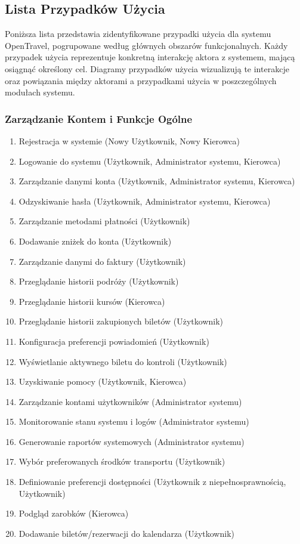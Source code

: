\documentclass[a4paper,12pt]{article}
\begin{document}
\subsection{Lista Przypadków Użycia}
Poniższa lista przedstawia zidentyfikowane przypadki użycia dla systemu OpenTravel, pogrupowane według głównych obszarów funkcjonalnych. Każdy przypadek użycia reprezentuje konkretną interakcję aktora z systemem, mającą osiągnąć określony cel. Diagramy przypadków użycia wizualizują te interakcje oraz powiązania między aktorami a przypadkami użycia w poszczególnych modułach systemu.

\subsubsection{Zarządzanie Kontem i Funkcje Ogólne}
\begin{enumerate}[label=\arabic*.]
    \item Rejestracja w systemie (Nowy Użytkownik, Nowy Kierowca)
    \item Logowanie do systemu (Użytkownik, Administrator systemu, Kierowca)
    \item Zarządzanie danymi konta (Użytkownik, Administrator systemu, Kierowca)
    \item Odzyskiwanie hasła (Użytkownik, Administrator systemu, Kierowca)
    \item Zarządzanie metodami płatności (Użytkownik)
    \item Dodawanie zniżek do konta (Użytkownik)
    \item Zarządzanie danymi do faktury (Użytkownik)
    \item Przeglądanie historii podróży (Użytkownik)
    \item Przeglądanie historii kursów (Kierowca)
    \item Przeglądanie historii zakupionych biletów (Użytkownik)
    \item Konfiguracja preferencji powiadomień (Użytkownik)
    \item Wyświetlanie aktywnego biletu do kontroli (Użytkownik)
    \item Uzyskiwanie pomocy (Użytkownik, Kierowca)
    \item Zarządzanie kontami użytkowników (Administrator systemu)
    \item Monitorowanie stanu systemu i logów (Administrator systemu)
    \item Generowanie raportów systemowych (Administrator systemu)
    \item Wybór preferowanych środków transportu (Użytkownik)
    \item Definiowanie preferencji dostępności (Użytkownik z niepełnosprawnością, Użytkownik)
    \item Podgląd zarobków (Kierowca)
    \item Dodawanie biletów/rezerwacji do kalendarza (Użytkownik)
\end{enumerate}
\end{document}
